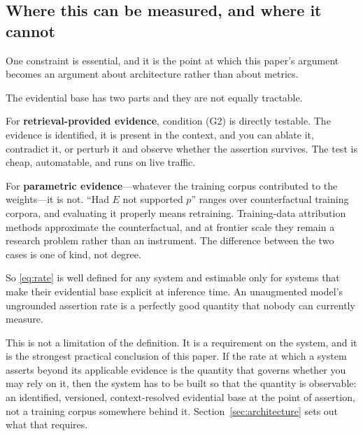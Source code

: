 \subsection{Where this can be measured, and where it cannot}
\label{sec:measurability}

One constraint is essential, and it is the point at which this paper's argument
becomes an argument about architecture rather than about metrics.

The evidential base has two parts and they are not equally tractable.

For \textbf{retrieval-provided evidence}, condition (G2) is directly testable.
The evidence is identified, it is present in the context, and you can ablate it,
contradict it, or perturb it and observe whether the assertion survives. The test
is cheap, automatable, and runs on live traffic.

For \textbf{parametric evidence}---whatever the training corpus contributed to the
weights---it is not. ``Had $E$ not supported $p$'' ranges over counterfactual
training corpora, and evaluating it properly means retraining. Training-data
attribution methods approximate the counterfactual, and at frontier scale they
remain a research problem rather than an instrument. The difference between the two
cases is one of kind, not degree.

So \eqref{eq:rate} is well defined for any system and estimable only for systems
that make their evidential base explicit at inference time. An unaugmented model's
ungrounded assertion rate is a perfectly good quantity that nobody can currently
measure.

This is not a limitation of the definition. It is a requirement on the system, and
it is the strongest practical conclusion of this paper. If the rate at which a
system asserts beyond its applicable evidence is the quantity that governs whether
you may rely on it, then the system has to be built so that the quantity is
observable: an identified, versioned, context-resolved evidential base at the
point of assertion, not a training corpus somewhere behind it.
Section~\ref{sec:architecture} sets out what that requires.
